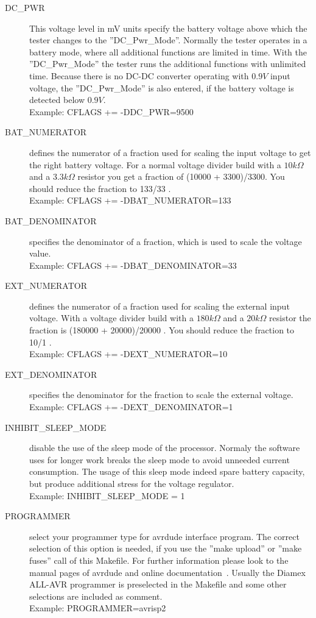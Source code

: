 \begin{description}
  \item[DC\_PWR] This voltage level in mV units specify the battery voltage above which the tester
changes to the ''DC\_Pwr\_Mode''. Normally the tester operates in a battery mode, where all additional
functions are limited in time. With the ''DC\_Pwr\_Mode'' the tester runs the additional functions with unlimited time.
Because there is no DC-DC converter operating with \(0.9V\) input voltage,
the ''DC\_Pwr\_Mode'' is also entered, if the battery voltage is detected below \(0.9V\). \\
Example: CFLAGS += -DDC\_PWR=9500

 \item[BAT\_NUMERATOR] defines the numerator of a fraction used for scaling the input voltage to get the right
battery voltage.
For a normal voltage divider build with a \(10 k\Omega\) and a \(3.3 k\Omega\) resistor you get a fraction 
of (10000 + 3300)/3300. 
You should reduce the fraction to 133/33 .\\
Example: CFLAGS += -DBAT\_NUMERATOR=133

 \item[BAT\_DENOMINATOR] specifies the denominator of a fraction, which is used to scale the voltage value.\\
Example: CFLAGS += -DBAT\_DENOMINATOR=33

 \item[EXT\_NUMERATOR] defines the numerator of a fraction used for scaling the external input voltage.
 With a voltage divider build with a \(180 k\Omega\) and a \(20 k\Omega\) resistor the fraction is (180000 + 20000)/20000 .
You should reduce the fraction to 10/1 .\\
Example: CFLAGS += -DEXT\_NUMERATOR=10

 \item[EXT\_DENOMINATOR] specifies the denominator for the fraction to scale the external voltage. \\
Example: CFLAGS += -DEXT\_DENOMINATOR=1

  \item[INHIBIT\_SLEEP\_MODE] disable the use of the sleep mode of the processor.
Normaly the software uses for longer work breaks the sleep mode to avoid unneeded current consumption.
The usage of this sleep mode indeed spare battery capacity, but produce additional stress for the voltage regulator.\\
Example: INHIBIT\_SLEEP\_MODE = 1

  \item[PROGRAMMER] select your programmer type for avrdude interface program.
The correct selection of this option is needed, if you use the ''make upload'' or ''make fuses'' call
of this Makefile.
For further information please look to the manual pages of avrdude and online documentation~\cite{avrdude}.
Usually the Diamex ALL-AVR programmer is preselected in the Makefile and some
other selections are included as comment.\\
Example: PROGRAMMER=avrisp2


\end{description}
